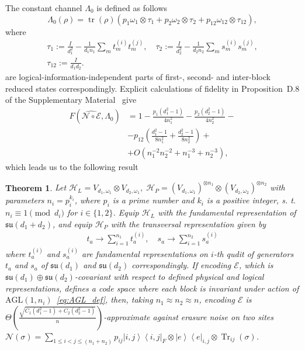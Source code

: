 \documentclass[10pt,twocolumn,superscriptaddress,aps,amsmath,amssymb,citeautoscript,floatfix,prx,longbibliography]{revtex4-2}
\newtheorem{theorem}{Theorem}
\theoremstyle{plain}
\theoremstyle{plain}
\theoremstyle{plain}
\theoremstyle{plain}
\theoremstyle{plain}
\theoremstyle{plain}
\begin{document}
The constant channel $\Lambda_0$ is defined as follows
\[  
    \Lambda_0(\rho)=\operatorname{tr}(\rho) \left(p_1\omega_1 \otimes \tau_1+p_2\omega_2 \otimes \tau_2+p_{12}\omega_{12} \otimes \tau_{12}\right),
\]
where
\[
\begin{gathered}
    \tau_1:=\frac{I}{d_1^2}-\frac{1}{d_1 n_1} \sum_m t_m^{(i)} t_m^{(j)}, \quad \tau_2:=\frac{I}{d_2^2}-\frac{1}{d_2 n_2} \sum_m s_m^{(i)} s_m^{(j)}, \\ \tau_{12}:=\frac{I}{d_1 d_2}.
\end{gathered}
\]
are logical-information-independent parts of first-, second- and inter-block reduced states correspondingly. Explicit calculations of fidelity in Proposition~D.8 of the Supplementary Material~\cite{SuppMat} give
\begin{equation}\label{eq:fidelity_2}
\begin{aligned}
   F\left(\widehat{\mathcal{N} \circ \mathcal{E}}, \Lambda_0\right)&=1-\frac{p_1(d_1^2-1)}{4n_1^2}-\frac{p_2(d_2^2-1)}{4n_2^2}-\\&-p_{12}\left(\frac{d_1^2-1}{8n_1^2}+\frac{d_2^2-1}{8n_2^2}\right)+\\&+O\!\left(n_1^{-2}n_2^{-2}+n_1^{-3}+n_2^{-3}\right), 
\end{aligned}
\end{equation}
which leads us to the following result
\begin{theorem}
    Let
    $
        \mathcal H_L=V_{d_1, \omega_1}\otimes V_{d_2,\omega_1},\;
        \mathcal H_P=(V_{d_1,\omega_1})^{\otimes n_1}\otimes (V_{d_2,\omega_2})^{\otimes n_2}
    $
    with parameters $n_i=p_i^{k_i}$, where $p_i$ is a prime number and $k_i$ is a positive integer, s. t. $n_i\equiv 1 \pmod{d_i}$ for $i\in\{1,2\}$.
    Equip \(\mathcal H_L\) with the fundamental representation of
    \(\mathfrak{su}(d_1+d_2)\), and equip \(\mathcal H_P\) with the transversal
    representation given by
    \begin{equation}
    \begin{gathered}
    t_a \rightarrow \sum_{i=1}^{n_1} t_a^{(i)}, \quad s_a \rightarrow \sum_{i=1}^{n_2} s_a^{(i)}
    \end{gathered}
    \end{equation} 
    where $t_a^{(i)}$ and $s_a^{(i)}$ are fundamental representations on $i$-th qudit of generators $t_a$ and $s_a$ of $\mathfrak{su}(d_1)$ and $\mathfrak{su}(d_2)$ correspondingly. 
    If encoding $\mathcal{E}$, which is $\mathfrak{su}(d_1)\oplus\mathfrak{su}(d_2)$-covariant with respect to defined physical and logical representations, defines a code space where each block is invariant under action of $\mathrm{AGL}(1, n_i)$~\eqref{eq:AGL_def}, then, taking $n_1\approx n_2 \approx n$, encoding $\mathcal{E}$ is $\Theta\left(\frac{\sqrt{C_1(d_1^2-1)+C_2(d_2^2-1)}}{n}\right)$-approximate against erasure noise on two sites $\mathcal{N}(\sigma)=\sum_{1 \leq i<j \leq (n_1+n_2)} p_{i j} \left|i, j\right\rangle\left\langle i, j\right|_F \otimes \left| e\right\rangle\left\langle e\right|_{i, j} \otimes \operatorname{Tr}_{i j}(\sigma)$. 
\end{theorem}
\end{document}
